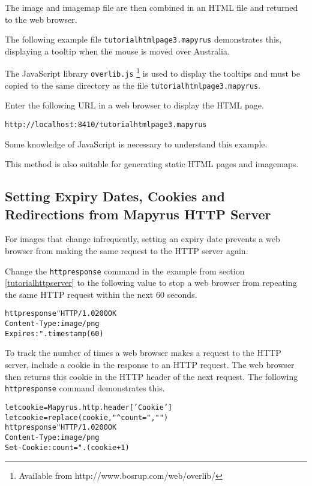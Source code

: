 The image and imagemap file are then combined in an HTML file
and returned to the web browser.

The following example file \texttt{tutorialhtmlpage3.mapyrus}
demonstrates this, displaying a tooltip when
the mouse is moved over Australia.



The JavaScript library \texttt{overlib.js}
\footnote{Available from http://www.bosrup.com/web/overlib/} is
used to display the tooltips and must be copied to the same
directory as the file \texttt{tutorialhtmlpage3.mapyrus}.

Enter the following URL in a web browser to display the HTML page.

\begin{verbatim}
http://localhost:8410/tutorialhtmlpage3.mapyrus
\end{verbatim}

Some knowledge of JavaScript is necessary to understand this example.

This method is also suitable for generating static HTML pages
and imagemaps.

\subsection{Setting Expiry Dates, Cookies and Redirections from
Mapyrus HTTP Server}
\label{cookies}

For images that change infrequently, setting an expiry date prevents
a web browser from making the same request to the HTTP server again.

Change the \texttt{httpresponse} command in the example
from section \ref{tutorialhttpserver} to the following value to
stop a web browser from repeating the same HTTP request within
the next 60 seconds.

\begin{alltt}
httpresponse "HTTP/1.0 200 OK
Content-Type: image/png
Expires: " . timestamp(60)
\end{alltt}

To track the number of times a web browser makes a request to the
HTTP server, include a cookie in the response to an HTTP request.
The web browser then returns this cookie in the HTTP header of
the next request.  The following \texttt{httpresponse} command
demonstrates this.

\begin{alltt}
let cookie = Mapyrus.http.header['Cookie']
let cookie = replace(cookie, "^count=", "")
httpresponse "HTTP/1.0 200 OK
Content-Type: image/png
Set-Cookie: count=" . (cookie + 1)
\end{alltt}

